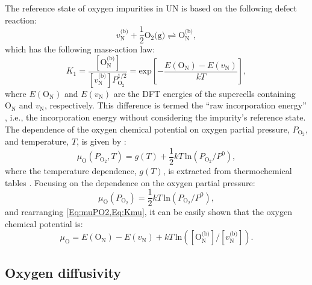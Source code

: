 \documentclass[preprint,12pt,sort&compress]{elsarticle}
\newcommand{\?}{\stackrel{?}{=}}
\providecommand{\DIFaddbegin}{\protect\color{blue}} %
\providecommand{\DIFaddend}{\protect\color{black}} %
\newcommand{\DIFaddincludegraphics}[2][]{{\color{blue}\fbox{\DIFOincludegraphics[#1]{#2}}}} %
\DeclareRobustCommand{\DIFaddbegin}{\DIFOaddbegin \let\includegraphics\DIFaddincludegraphics} %
\DeclareRobustCommand{\DIFaddend}{\DIFOaddend \let\includegraphics\DIFOincludegraphics} %
\begin{document}
The reference state of oxygen impurities in UN is based on the following defect reaction:
\begin{equation}
v_\text{N}^\text{(b)} + \frac{1}{2} \text{O}_2 \text{(g)} \rightleftharpoons \text{O}_\text{N}^\text{(b)},
\end{equation}
which has the following mass-action law:
\begin{equation}
K_1 = \frac{ [ \text{O}_\text{N}^\text{(b)} ] }{ [ v_\text{N}^\text{(b)} ] P_{\text{O}_2}^{1/2} } = \text{exp}\! \left[ - \frac{E( \text{O}_\text{N} ) - E( v_\text{N} )}{kT} \right],
\label{Eq:Kmu}
\end{equation}
where $E( \text{O}_\text{N} )$ and $E( v_\text{N} )$ are the DFT energies of the supercells containing $\text{O}_\text{N}$ and $v_\text{N}$, respectively. This difference is termed the ``raw incorporation energy'' \cite{AbdulHameed2024}, i.e., the incorporation energy without considering the impurity's reference state. The dependence of the oxygen chemical potential on oxygen partial pressure, $P_{\text{O}_2}$, and temperature, $T$, is given by \cite{Finnis2005}:
\begin{equation}
\mu_\text{O}(P_{\text{O}_2}, T) = g(T) + \frac{1}{2} kT \, \text{ln} \!\left( P_{\text{O}_2} / P^0 \right),
\label{Eq:muTPO2}
\end{equation}
where the temperature dependence, $g(T)$, is extracted from thermochemical tables \cite{Linstrom2024}. Focusing on the dependence on the oxygen partial pressure:
\begin{equation}
\mu_\text{O}(P_{\text{O}_2}) = \frac{1}{2} kT \, \text{ln} \!\left( P_{\text{O}_2} / P^0 \right),
\label{Eq:muPO2}
\end{equation}
and rearranging \cref{Eq:muPO2,Eq:Kmu}, it can be easily shown that the oxygen chemical potential is:
\begin{equation}
\mu_\text{O} = E( \text{O}_\text{N} ) - E( v_\text{N} ) + kT \, \text{ln} \! \left( [ \text{O}_\text{N}^\text{(b)} ] / [ v_\text{N}^\text{(b)} ] \right).
\label{Eq:OxygenTruePot}
\end{equation}

\subsection{Oxygen diffusivity}
\DIFaddbegin \label{Sec:Diff}
\DIFaddend 
\end{document}
